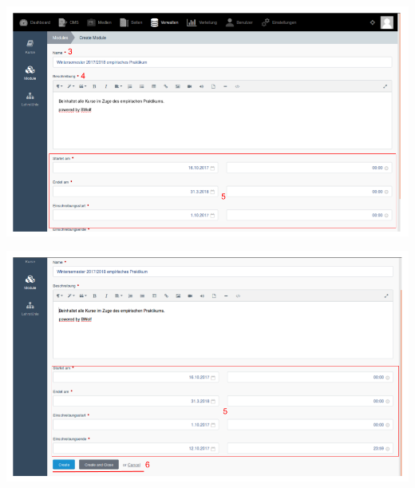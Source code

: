     \includegraphics[scale=0.3]{backend/img/module_2.png}

    \includegraphics[scale=0.3]{backend/img/module_3.png}
    
